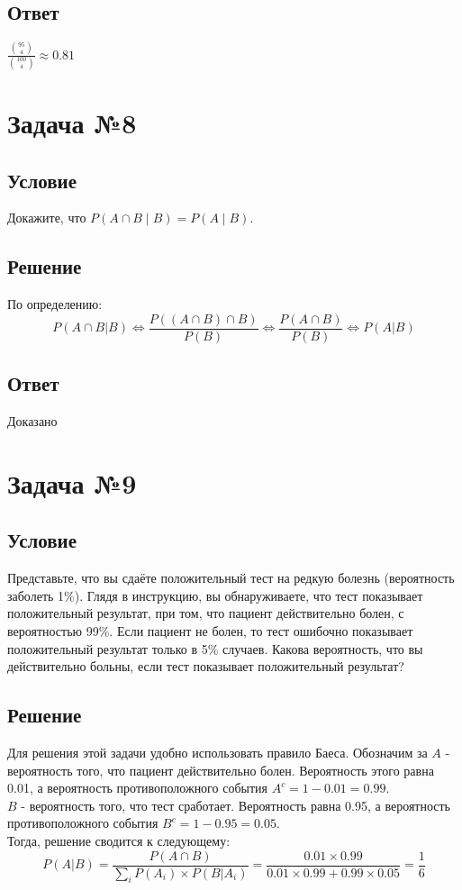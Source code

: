 \documentclass{article}
\begin{document}
\subsection*{Ответ}
$\frac{\binom{95}{4}}{\binom{100}{4}} \approx 0.81$
\section*{Задача №8}
\subsection*{Условие}
Докажите, что \(P(A \cap B\mid B) = P(A\mid B)\).
\subsection*{Решение}
По определению:
\[
    P(A\cap B|B) \iff \frac{P((A\cap B) \cap B)}{P(B)} \iff \frac{P(A \cap B)}{P(B)} \iff P(A|B)
\]
\subsection*{Ответ}
Доказано
\section*{Задача №9}
\subsection*{Условие}
Представьте, что вы сдаёте положительный тест на редкую болезнь
(вероятность заболеть 1\%). Глядя в инструкцию, вы обнаруживаете, что тест
показывает положительный результат, при том, что пациент действительно болен, с
вероятностью 99\%. Если пациент не болен, то тест ошибочно показывает
положительный результат только в 5\% случаев. Какова вероятность, что вы
действительно больны, если тест показывает положительный результат?
\subsection*{Решение}
Для решения этой задачи удобно использовать правило Баеса.
Обозначим за $A$ - вероятность того, что пациент действительно болен. Вероятность этого равна 0.01, а вероятность противоположного события $A^c = 1-0.01 = 0.99$.\\
$B$ - вероятность того, что тест сработает. Вероятность равна 0.95, а вероятность противоположного события $B^c = 1 - 0.95 = 0.05$.\\
Тогда, решение сводится к следующему:\\
\[
    P(A|B) = \frac{P(A \cap B)}{\sum_i P(A_i)\times P(B|A_i)} = \frac{0.01 \times 0.99}{0.01\times 0.99 + 0.99 \times 0.05} = \frac{1}{6}
\]
\end{document}

